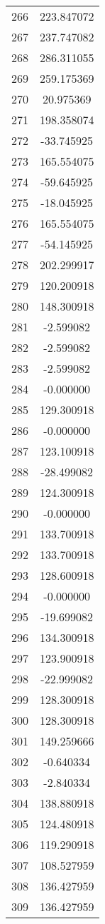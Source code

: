 \documentclass[12pt]{article}
\begin{document}
\begin{longtable}{@{}cc@{}}
266 & 223.847072 \\
267 & 237.747082 \\
268 & 286.311055 \\
269 & 259.175369 \\
270 & 20.975369 \\
271 & 198.358074 \\
272 & -33.745925 \\
273 & 165.554075 \\
274 & -59.645925 \\
275 & -18.045925 \\
276 & 165.554075 \\
277 & -54.145925 \\
278 & 202.299917 \\
279 & 120.200918 \\
280 & 148.300918 \\
281 & -2.599082 \\
282 & -2.599082 \\
283 & -2.599082 \\
284 & -0.000000 \\
285 & 129.300918 \\
286 & -0.000000 \\
287 & 123.100918 \\
288 & -28.499082 \\
289 & 124.300918 \\
290 & -0.000000 \\
291 & 133.700918 \\
292 & 133.700918 \\
293 & 128.600918 \\
294 & -0.000000 \\
295 & -19.699082 \\
296 & 134.300918 \\
297 & 123.900918 \\
298 & -22.999082 \\
299 & 128.300918 \\
300 & 128.300918 \\
301 & 149.259666 \\
302 & -0.640334 \\
303 & -2.840334 \\
304 & 138.880918 \\
305 & 124.480918 \\
306 & 119.290918 \\
307 & 108.527959 \\
308 & 136.427959 \\
309 & 136.427959 \\

\end{longtable}
\end{document}

